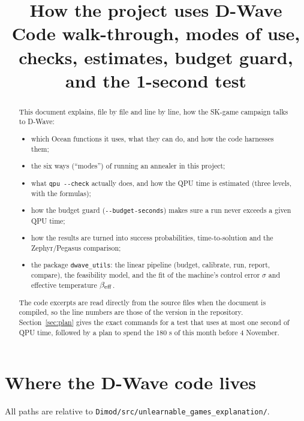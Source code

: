 \documentclass[11pt,a4paper]{article}
\title{How the project uses D-Wave\\[4pt]\large Code walk-through, modes of use, checks, estimates, budget guard, and the 1-second test}
\author{\code{Projects_master_HPQC/scripts/QuantumComputing/Dimod}}
\date{}
\newcommand{\code}[1]{\nolinkurl{#1}}
\begin{document}
\maketitle
\begin{abstract}
This document explains, file by file and line by line, how the SK-game campaign talks to D-Wave:
\begin{itemize}
\item which Ocean functions it uses, what they can do, and how the code harnesses them;
\item the six ways (``modes'') of running an annealer in this project;
\item what \code{qpu --check} actually does, and how the QPU time is estimated (three levels, with the formulas);
\item how the budget guard (\code{--budget-seconds}) makes sure a run never exceeds a given QPU time;
\item how the results are turned into success probabilities, time-to-solution and the Zephyr/Pegasus comparison;
\item the package \code{dwave_utils}: the linear pipeline (budget, calibrate, run, report, compare), the
  feasibility model, and the fit of the machine's control error $\sigma$ and effective temperature $\beta_{\rm eff}$.
\end{itemize}
The code excerpts are read directly from the source files when the document is compiled, so the line numbers
are those of the version in the repository. Section~\ref{sec:plan} gives the exact commands for a test
that uses at most one second of QPU time, followed by a plan to spend the 180 s of this month before 4 November.
\end{abstract}
\tableofcontents
\newpage

\section{Where the D-Wave code lives}
All paths are relative to \code{Dimod/src/unlearnable_games_explanation/}.
\end{document}
